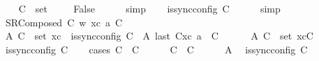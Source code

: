 \begin{isabellebody}
\ \ \isamarkupfalse%
\ {\isachardoublequoteopen}C{\isacharprime}{\kern0pt}\ {\isasymin}\ set\ {\isacharbrackleft}{\kern0pt}{\isacharbrackright}{\kern0pt}{\isachardoublequoteclose}\isanewline
\ \ \isamarkupfalse%
\ False\isanewline
\ \ \ \ \isamarkupfalse%
\ simp\isanewline
\ \ \isamarkupfalse%
\ {\isachardoublequoteopen}is{\isacharunderscore}{\kern0pt}sync{\isacharunderscore}{\kern0pt}config\ C{\isacharprime}{\kern0pt}{\isachardoublequoteclose}\isanewline
\ \ \ \ \isamarkupfalse%
\ simp\isanewline
{}\isamarkupfalse%
\isanewline
\ \ \isamarkupfalse%
\ {\isacharparenleft}{\kern0pt}SRComposed\ C{}\ w\ xc\ a\ C{\isacharparenright}{\kern0pt}\isanewline
\ \ \isamarkupfalse%
\ A{}{\isacharcolon}{\kern0pt}\ {\isachardoublequoteopen}C{\isacharprime}{\kern0pt}\ {\isasymin}\ set\ xc\ {\isasymLongrightarrow}\ is{\isacharunderscore}{\kern0pt}sync{\isacharunderscore}{\kern0pt}config\ C{\isacharprime}{\kern0pt}{\isachardoublequoteclose}\ \ A{}{\isacharcolon}{\kern0pt}\ {\isachardoublequoteopen}last\ {\isacharparenleft}{\kern0pt}C{}{\isacharhash}{\kern0pt}xc{\isacharparenright}{\kern0pt}\ {\isasymmidarrow}{\isasymlangle}a{\isacharcomma}{\kern0pt}\ {\isasymzero}{\isasymrangle}{\isasymrightarrow}\ C{\isachardoublequoteclose}\isanewline
\ \ \ \ \ \ A{}{\isacharcolon}{\kern0pt}\ {\isachardoublequoteopen}C{\isacharprime}{\kern0pt}\ {\isasymin}\ set\ {\isacharparenleft}{\kern0pt}xc{\isasymcdot}{\isacharbrackleft}{\kern0pt}C{\isacharbrackright}{\kern0pt}{\isacharparenright}{\kern0pt}{\isachardoublequoteclose}\isanewline
\ \ \isamarkupfalse%
\ {\isachardoublequoteopen}is{\isacharunderscore}{\kern0pt}sync{\isacharunderscore}{\kern0pt}config\ C{\isacharprime}{\kern0pt}{\isachardoublequoteclose}\isanewline
\ \ \isamarkupfalse%
\ {\isacharparenleft}{\kern0pt}cases\ {\isachardoublequoteopen}C\ {\isacharequal}{\kern0pt}\ C{\isacharprime}{\kern0pt}{\isachardoublequoteclose}{\isacharparenright}{\kern0pt}\isanewline
\ \ \ \ \isamarkupfalse%
\ {\isachardoublequoteopen}C\ {\isacharequal}{\kern0pt}\ C{\isacharprime}{\kern0pt}{\isachardoublequoteclose}\isanewline
\ \ \ \ \isamarkupfalse%
\ A{}\ \isamarkupfalse%
\ {\isachardoublequoteopen}is{\isacharunderscore}{\kern0pt}sync{\isacharunderscore}{\kern0pt}config\ C{\isacharprime}{\kern0pt}{\isachardoublequoteclose}\isanewline

\end{isabellebody}
